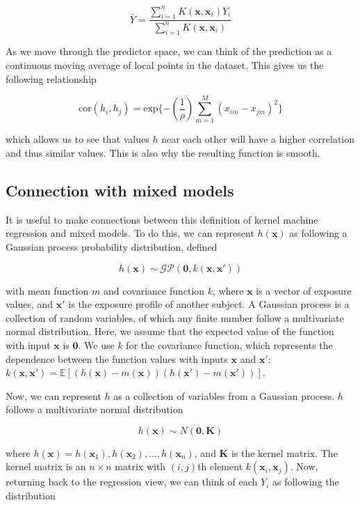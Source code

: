 \documentclass[12pt, twoside]{amherstthesis}
\begin{document}
\[
\bar{Y} = \frac{\sum_{i=1}^n K(\textbf{x}, \textbf{x}_i) Y_i}
{\sum_{i=1}^n K(\textbf{x}, \textbf{x}_i)}
\]

As we move through the predictor space, we can think of the prediction as a continuous moving average of local points in the dataset. This gives us the following relationship

\[
\textrm{cor}(h_i, h_j) = \textrm{exp}\{-(\frac{1}{\rho}) \sum_{m=1}^M
{(x_{im}-x_{jm})^2}\}
\]

\noindent which allows us to see that values \(h\) near each other will have a higher correlation and thus similar values. This is also why the resulting function is smooth.

\hypertarget{connection-with-mixed-models}{%
\subsection{Connection with mixed models}\label{connection-with-mixed-models}}

It is useful to make connections between this definition of kernel machine regression and mixed models. To do this, we can represent \(h(\textbf{x})\) as following a Gaussian process probability distribution, defined

\[
h(\textbf{x}) \sim \mathcal{GP}(\textbf{0}, k(\textbf{x}, \textbf{x}'))
\]

\noindent with mean function \(m\) and covariance function \(k\), where \(\textbf{x}\) is a vector of exposure values, and \(\textbf{x}'\) is the exposure profile of another subject. A Gaussian process is a collection of random variables, of which any finite number follow a multivariate normal distribution. Here, we assume that the expected value of the function with input \(\textbf{x}\) is \(\textbf{0}\). We use \(k\) for the covariance function, which represents the dependence between the function values with inputs \(\textbf{x}\) and \(\textbf{x}'\): \(k(\textbf{x}, \textbf{x}') = \mathbb{E}[(h(\textbf{x})-m(\textbf{x})) (h(\textbf{x}')-m(\textbf{x}'))]\).

Now, we can represent \(h\) as a collection of variables from a Gaussian process. \(h\) follows a multivariate normal distribution

\[
h({\textbf{x}}) \sim N(\textbf{0}, \textbf{K})
\]

\noindent where \(h({\textbf{x}}) = h(\textbf{x}_1), h(\textbf{x}_2), \dots, h(\textbf{x}_n)\), and \(\textbf{K}\) is the kernel matrix. The kernel matrix is an \(n \times n\) matrix with \((i, j)\)th element \(k(\textbf{x}_i, \textbf{x}_j)\). Now, returning back to the regression view, we can think of each \(Y_i\) as following the distribution
\end{document}
